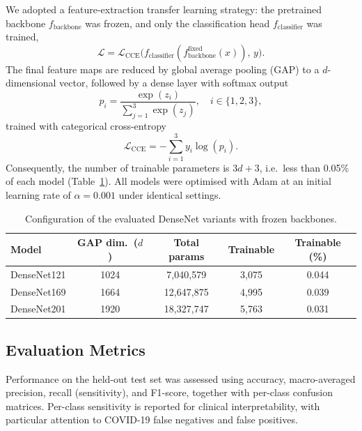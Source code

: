 \documentclass[pdflatex,sn-mathphys-num]{sn-jnl}%
\theoremstyle{thmstyleone}%
\theoremstyle{thmstyletwo}%
\theoremstyle{thmstylethree}%
\begin{document}
We adopted a feature-extraction transfer learning strategy: the pretrained backbone $f_{\text{backbone}}$ was frozen, and only the classification head $f_{\text{classifier}}$ was trained,
\begin{equation}
\mathcal{L} = \mathcal{L}_{\text{CCE}}\big(f_{\text{classifier}}(f_{\text{backbone}}^{\text{fixed}}(x)),\, y\big).
\end{equation}
The final feature maps are reduced by global average pooling (GAP) to a $d$-dimensional vector, followed by a dense layer with softmax output
\begin{equation}
p_i = \frac{\exp(z_i)}{\sum_{j=1}^{3} \exp(z_j)}, \quad i \in \{1, 2, 3\},
\end{equation}
trained with categorical cross-entropy
\begin{equation}
\mathcal{L}_{\text{CCE}} = -\sum_{i=1}^{3} y_i \log(p_i).
\end{equation}
Consequently, the number of trainable parameters is $3d + 3$, i.e.\ less than 0.05\% of each model (Table~\ref{tab:models}). All models were optimised with Adam at an initial learning rate of $\alpha = 0.001$ under identical settings.

\begin{table}[htbp]
\centering
\caption{Configuration of the evaluated DenseNet variants with frozen backbones.}
\label{tab:models}
\begin{tabular}{l c c c c}
\toprule
\textbf{Model} & \textbf{GAP dim.\ ($d$)} & \textbf{Total params} & \textbf{Trainable} & \textbf{Trainable (\%)} \\
\midrule
DenseNet121 & 1024 & 7,040,579 & 3,075 & 0.044 \\
DenseNet169 & 1664 & 12,647,875 & 4,995 & 0.039 \\
DenseNet201 & 1920 & 18,327,747 & 5,763 & 0.031 \\
\bottomrule
\end{tabular}
\end{table}

\subsection{Evaluation Metrics}
\label{subsec:metrics}

Performance on the held-out test set was assessed using accuracy, macro-averaged precision, recall (sensitivity), and F1-score, together with per-class confusion matrices. Per-class sensitivity is reported for clinical interpretability, with particular attention to COVID-19 false negatives and false positives.
\end{document}
